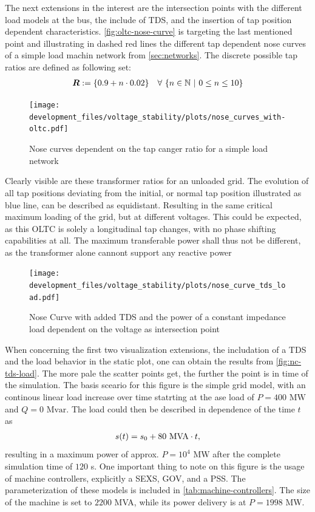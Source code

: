 The next extensions in the interest are the intersection points with the different load models at the bus, the include of \acs{TDS}, and the insertion of tap position dependent characteristics.
\autoref{fig:oltc-nose-curve} is targeting the last mentioned point and illustrating in dashed red lines the different tap dependent nose curves of a simple load machin network from \autoref{sec:networks}.
The discrete possible tap ratios are defined as following set:
\begin{align}
    \boldsymbol{R} := \{0.9 + n \cdot 0.02\} \quad \forall~\{ n \in \mathbb{N}~\vert~0 \leq n \leq 10 \} \notag
\end{align}

\begin{figure}[htbp!]
    \centering
    \texttt{[image: development\_files/voltage\_stability/plots/nose\_curves\_with-oltc.pdf]}
    \caption[Nose curves dependent on the tap changer ratio for a simple load network]{Nose curves dependent on the tap canger ratio for a simple load network}
    \label{fig:oltc-nose-curve}
\end{figure}

Clearly visible are these transformer ratios for an unloaded grid.
The evolution of all tap positions deviating from the initial, or normal tap position illustrated as blue line, can be described as equidistant.
Resulting in the same critical maximum loading of the grid, but at different voltages.
This could be expected, as this \acs{OLTC} is solely a longitudinal tap changes, with no phase shifting capabilities at all.
The maximum transferable power shall thus not be different, as the transformer alone cannont support any reactive power

\begin{figure}[htbp!]
    \centering
    \texttt{[image: development\_files/voltage\_stability/plots/nose\_curve\_tds\_load.pdf]}
    \caption{Nose Curve with added \acs{TDS} and the power of a constant impedance load dependent on the voltage as intersection point}
    \label{fig:nc-tds-load}
\end{figure}

When concerning the first two visualization extensions, the includation of a \acs{TDS} and the load behavior in the static plot, one can obtain the results from \autoref{fig:nc-tds-load}.
The more pale the scatter points get, the further the point is in time of the simulation.
The basis sceario for this figure is the simple grid model, with an continous linear load increase over time statrting at the ase load of $P=400\text{ MW}$ and $Q=0\text{ Mvar}$.
The load could then be described in dependence of the time $t$ as 
\begin{align}
    s(t) = s_0 + 80\text{ MVA} \cdot t \notag,
\end{align}
resulting in a maximum power of approx. $P=10^4\text{ MW}$ after the complete simulation time of $120$ s.
One important thing to note on this figure is the usage of machine controllers, explicitly a \ac{SEXS}, \ac{GOV}, and a \ac{PSS}.
The parameterization of these models is included in \autoref{tab:machine-controllers}.
The size of the machine is set to $2200$ MVA, while its power delivery is at $P=1998$ MW.


